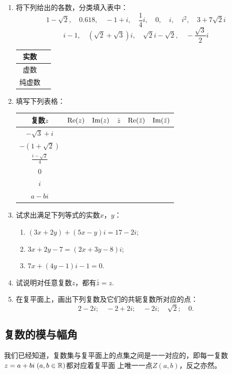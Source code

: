 \begin{ex}
\begin{enumerate}
    \item 将下列给出的各数，分类填入表中：
\[1-\sqrt{2},\quad 0.618,\quad -1+i,\quad \frac{1}{4}i,\quad 0,\quad i,\quad i^2,\quad 3+7\sqrt{2}i\]
\[i-1,\quad (\sqrt{2}+\sqrt{3})i,\quad \sqrt{2}i-\sqrt{2},\quad -\frac{\sqrt{3}}{2}i\]
\begin{tabular}{|c|p{}|}
\hline
    实数&\\
\hline
虚数&\\\hline
纯虚数&\\    \hline
\end{tabular}

\item 填写下列表格：
\begin{center}
\begin{tabular}{|c|p{}|p{}|p{}|p{}|p{}|}
\hline 
复数$z$& ${\rm Re}(z)$& ${\rm Im}(z)$&$\bar z$& ${\rm Re}(\bar z)$& ${\rm Im}(\bar z)$\\
\hline
$-\sqrt{3}+i$ &&&&&\\
$-(1+\sqrt{2})$&&&&&\\
$\frac{i-\sqrt{2}}{4}$&&&&&\\
$0$&&&&&\\
$i$&&&&&\\
$a-bi$&&&&&\\
\hline
\end{tabular}
\end{center}
\item 试求出满足下列等式的实数$x$，$y$：
\begin{enumerate}[(1)]
\item $(3x+2y)+(5x-y)i=17-2i$;
\item $3x+2y-7=(2x+3y-8)i$;
\item $7x+(4y-1)i-1=0$.
\end{enumerate}

\item 试说明对任意复数$z$，都有$\overline{\bar z}=z$.
\item 在复平面上，画出下列复数及它们的共轭复数所对应的点：
\[2-2i;\quad -2+2i;\quad -2i; \quad \sqrt{2};\quad 0.\]
\end{enumerate}
\end{ex}

\subsection{复数的模与幅角}
我们已经知道，复数集与复平面上的点集之间是一一对应的，即每一复数$z=a+bi\; (a,b\in\mathbb{R})$都对应着复平面
上唯一一点$Z(a,b)$，反之亦然。

